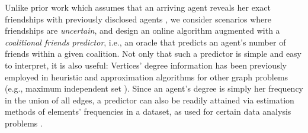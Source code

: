 \documentclass[letterpaper]{article} %
\begin{document}
%

%

Unlike prior work which assumes that an arriving agent reveals her exact friendships with previously disclosed agents \cite{flammini2021online}, we consider scenarios where friendships are \textit{uncertain}, and design an online algorithm augmented with a \textit{coalitional friends predictor}, i.e., an oracle that predicts an agent's number of friends within a given coalition. Not only that such a predictor is simple and easy to interpret, it is also useful: Vertices' degree information has been previously employed in heuristic and approximation algorithms for other graph problems (e.g., maximum independent set \cite{halldorsson1994greed}). Since an agent's degree is simply her frequency in the union of all edges, a predictor can also be readily attained via estimation methods of elements' frequencies in a dataset, as used for certain data analysis problems \cite{hsu2019learning}.
%
\end{document}
